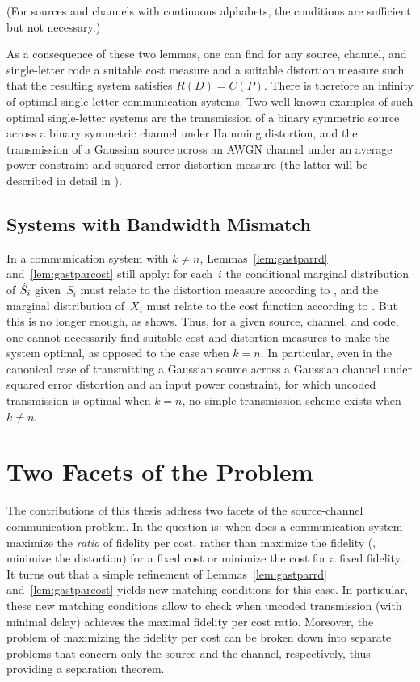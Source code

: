 (For sources and channels with continuous alphabets, the conditions are
sufficient but not necessary.)

As a consequence of these two lemmas, one can find for any source, channel, and
single-letter code a suitable cost measure and a suitable distortion measure
such that the resulting system satisfies $R(D) = C(P)$. There is therefore an
infinity of optimal single-letter communication systems. Two well known examples
of such optimal single-letter systems are the transmission of a binary symmetric
source across a binary symmetric channel under Hamming distortion, and the
transmission of a Gaussian source across an AWGN channel under an average power
constraint and squared error distortion measure (the latter will be described in
detail in ).


\subsection{Systems with Bandwidth Mismatch}

In a communication system with $k \ne n$, Lemmas~\ref{lem:gastparrd}
and~\ref{lem:gastparcost} still apply: for each~$i$ the conditional marginal
distribution of ${\hat{S}}_i$ given~$S_i$ must relate to the distortion measure
according to , and the marginal distribution of~$X_i$ must
relate to the cost function according to . But this is no
longer enough, as  shows. Thus, for a given source,
channel, and code, one cannot necessarily find suitable cost and distortion
measures to make the system optimal, as opposed to the case when $k = n$.  In
particular, even in the canonical case of transmitting a Gaussian source across
a Gaussian channel under squared error distortion and an input power constraint,
for which uncoded transmission is optimal when $k = n$, no simple transmission
scheme exists when $k \ne n$.


\section{Two Facets of the Problem}\label{sec:twofacets}

The contributions of this thesis address two facets of the source-channel
communication problem. In  the question is: when does a
communication system maximize the \emph{ratio} of fidelity per cost, rather than
maximize the fidelity (\ie, minimize the distortion) for a fixed cost or
minimize the cost for a fixed fidelity.  It turns out that a simple refinement
of Lemmas~\ref{lem:gastparrd} and~\ref{lem:gastparcost} yields new matching
conditions for this case. In particular, these new matching conditions allow to
check when uncoded transmission (with minimal delay) achieves the maximal
fidelity per cost ratio. Moreover, the problem of maximizing the fidelity per
cost can be broken down into separate problems that concern only the source and
the channel, respectively, thus providing a separation theorem. 


